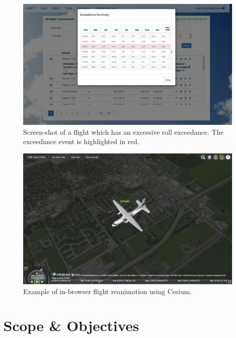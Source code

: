 	\begin{figure}
    	\centering
        \includegraphics[width=\linewidth]{img/exceedance_example.png}
        \caption{Screen-shot of a flight which has an excessive roll exceedance.  The exceedance event is highlighted in red.}
        \label{fig:exceedance_example}
    \end{figure}
    
    \begin{figure}
    	\centering
        \includegraphics[width=\linewidth]{img/cesium_example.jpg}
        \caption{Example of in-browser flight reanimation using Cesium.}
        \label{fig:cesium_example}
    \end{figure}


\section{Scope \& Objectives} \label{sec:objectives}

